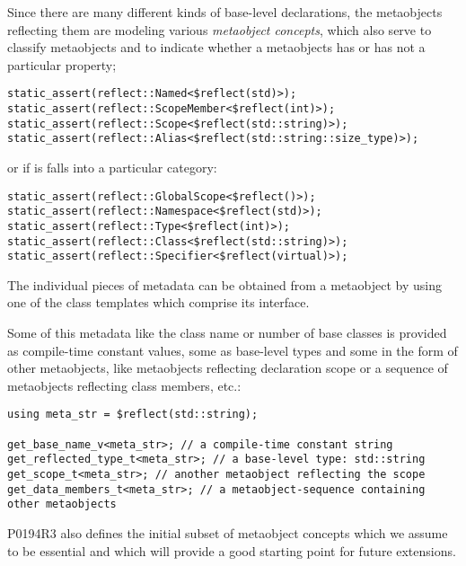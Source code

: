 Since there are many different kinds of
base-level declarations, the metaobjects reflecting them are
modeling various {\em metaobject concepts}, which also serve to classify
metaobjects and to indicate whether a metaobjects has or has not a particular
property;

\begin{verbatim}
static_assert(reflect::Named<$reflect(std)>);
static_assert(reflect::ScopeMember<$reflect(int)>);
static_assert(reflect::Scope<$reflect(std::string)>);
static_assert(reflect::Alias<$reflect(std::string::size_type)>);
\end{verbatim}

or if is falls into a particular category:

\begin{verbatim}
static_assert(reflect::GlobalScope<$reflect()>);
static_assert(reflect::Namespace<$reflect(std)>);
static_assert(reflect::Type<$reflect(int)>);
static_assert(reflect::Class<$reflect(std::string)>);
static_assert(reflect::Specifier<$reflect(virtual)>);
\end{verbatim}

The individual pieces of metadata can be obtained from a metaobject by using one
of the class templates which comprise its interface.

Some of this metadata like the class name or number of base classes is provided
as compile-time constant values, some as base-level types
and some in the form of other metaobjects, like metaobjects
reflecting declaration scope or a sequence of metaobjects reflecting class members,
etc.:

\begin{verbatim}
using meta_str = $reflect(std::string);

get_base_name_v<meta_str>; // a compile-time constant string
get_reflected_type_t<meta_str>; // a base-level type: std::string
get_scope_t<meta_str>; // another metaobject reflecting the scope
get_data_members_t<meta_str>; // a metaobject-sequence containing other metaobjects
\end{verbatim}

P0194R3 also defines the initial subset
of metaobject concepts which we assume to be essential
and which will provide a good starting point for future extensions.

